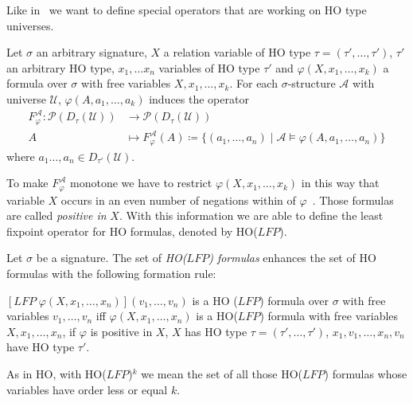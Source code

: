 Like in~\cite{freireMartins2011descriptive} we want to define special operators that are working on HO type
universes.

\begin{definition}
    Let $\sigma$ an arbitrary signature, $X$ a relation variable of HO type $\tau = (\tau', \dots, \tau')$,
    $\tau'$ an arbitrary HO type, $x_1, \dots x_n$ variables of HO type $\tau'$ and $\varphi(X, x_1, \dots, x_k)$ a
    formula over $\sigma$ with free variables $X, x_1, \dots, x_k$. For each $\sigma$-structure $\mathcal{A}$ with
    universe $\mathcal{U}$, $\varphi(A, a_1, \dots, a_k)$ induces the operator
    \begin{align*}
        F_\varphi^\mathcal{A}\colon\mathscr{P}(D_\tau(\mathcal{U})) &\longrightarrow \mathscr{P}(D_\tau(\mathcal{U}))\\
        A &\longmapsto F_\varphi^\mathcal{A}(A) \coloneqq \{(a_1, \dots, a_n) \mid \mathcal{A} \models \varphi(A, a_1,
        \dots, a_n)\}
    \end{align*}
    where $a_1 \dots, a_n \in D_{\tau'}(\mathcal{U})$.
\end{definition}

To make $F_\varphi^\mathcal{A}$ monotone we have to restrict $\varphi(X, x_1, \dots, x_k)$ in this way that variable
$X$ occurs in an even number of negations within of $\varphi$~\cite{freireMartins2011descriptive}. Those formulas
are called \textit{positive in} $X$. With this information we are able to define the least fixpoint operator for HO
formulas, denoted by HO($\mathit{LFP}$).

\begin{definition}
    Let $\sigma$ be a signature. The set of \emph{HO($\mathit{LFP}$) formulas} enhances the set of HO formulas with the
    following formation rule:
    \begin{compactitem}
        \item $[\mathit{LFP}\;\varphi(X, x_1, \dots, x_n)](v_1, \dots, v_n)$ is a HO
        ($\mathit{LFP}$) formula over $\sigma$ with free variables $v_1, \dots, v_n$ iff $\varphi(X, x_1, \dots, x_n)
        $ is a HO($\mathit{LFP}$) formula with free variables $X, x_1, \dots, x_n$, if $\varphi$ is positive in
        $X$, $X$ has HO type $\tau = (\tau', \dots, \tau')$, $x_1, v_1, \dots, x_n, v_n$ have HO type $\tau'$.
    \end{compactitem}
\end{definition}

As in HO, with HO($\mathit{LFP}$)$^k$ we mean the set of all those HO($\mathit{LFP}$) formulas whose variables have
order less or equal $k$.

